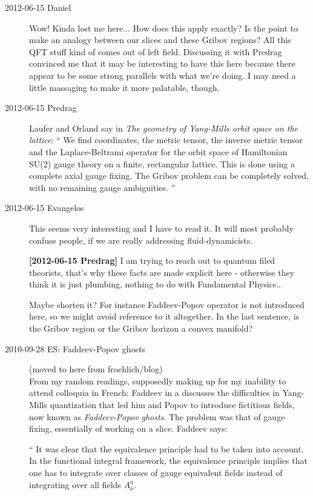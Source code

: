 \begin{description}
\item[2012-06-15 Daniel]
Wow! Kinda lost me here... How does this apply exactly? Is the
point to make an analogy between our slices and these Gribov regions?
All this QFT stuff kind of comes out of left field. Discussing
it with Predrag convinced me that it may be interesting to have this here
because there appear to be some strong parallels with what we're doing. I
may need a little massaging to make it more palatable, though.

\item[2012-06-15 Predrag]
Laufer and Orland say in
{\em The geometry of {Yang-Mills} orbit space on the lattice}: ``
We find coordinates, the metric tensor, the inverse metric tensor and the
Laplace-Beltrami operator for the orbit space of Hamiltonian SU(2) gauge
theory on a finite, rectangular lattice. This is done using a complete
axial gauge fixing. The Gribov problem can be completely solved, with no
remaining gauge ambiguities.
''

\item[2012-06-15 Evangelos]
This seems very interesting and I have to read it. It will most probably
confuse people, if we are really addressing fluid-dynamicists.

{\bf [2012-06-15 Predrag]} I am trying to reach out to quantum filed
theorists, that's why these facts are made explicit here - otherwise they
think it is just plumbing, nothing to do with Fundamental Physics..

Maybe shorten it? For instance Faddeev-Popov operator is not introduced
here, so we might avoid reference to it altogether. In the last sentence,
is the Gribov region or the Gribov horizon a convex manifold?

\item[2010-09-28 ES: Faddeev-Popov ghosts]                    \toCB
(moved to here from froehlich/blog)
\\
From my random readings, supposedly making up for my inability to attend
colloquia in French: Faddeev in a
 discusses the difficulties in Yang-Mills quantization that led
him and Popov to introduce fictitious fields, now known as
\emph{Faddeev-Popov ghosts}. The problem was that of gauge fixing,
essentially of working on a slice. Faddeev says:

`` %
It was clear that the equivalence principle had to be taken into account.
In the functional integral framework, the equivalence principle implies
that one has to integrate over classes of gauge equivalent fields instead
of integrating over all fields $A_\mu^a$.


\end{description}
